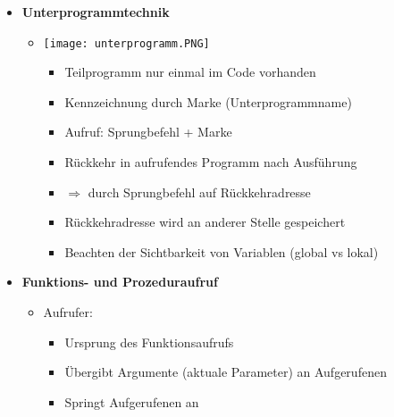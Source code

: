 \begin{itemize}
        \item \textbf{Unterprogrammtechnik}
            \begin{itemize}
                \item[]
                    \begin{minipage}{0.25\textwidth}
                        \texttt{[image: unterprogramm.PNG]}
                    \end{minipage}
                    \begin{minipage}{0.65\textwidth}
                        \begin{itemize}
                            \item Teilprogramm nur einmal im Code vorhanden
                            \item Kennzeichnung durch Marke (Unterprogrammname)
                            \item Aufruf: Sprungbefehl + Marke 
                            \item Rückkehr in aufrufendes Programm nach Ausführung
                            \item[] $\Rightarrow$ durch Sprungbefehl auf Rückkehradresse
                            \item Rückkehradresse wird an anderer Stelle gespeichert
                            \item Beachten der Sichtbarkeit von Variablen (global vs lokal)
                        \end{itemize}
                    \end{minipage}
            \end{itemize}

\pagebreak

        \item \textbf{Funktions- und Prozeduraufruf}
            \begin{itemize}
                \item Aufrufer:
                    \begin{itemize}
                        \item Ursprung des Funktionsaufrufs
                        \item Übergibt Argumente (aktuale Parameter) an Aufgerufenen
                        \item Springt Aufgerufenen an
                    \end{itemize}


\end{itemize}
\end{itemize}
